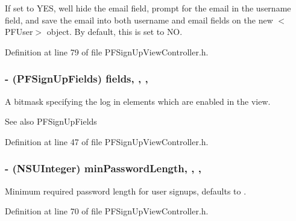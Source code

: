 If set to {\ttfamily Y\+E\+S}, we\textquotesingle{}ll hide the email field, prompt for the email in the username field, and save the email into both username and email fields on the new $<$\+P\+F\+User$>$ object. By default, this is set to {\ttfamily N\+O}. 

Definition at line 79 of file P\+F\+Sign\+Up\+View\+Controller.\+h.

\hypertarget{interface_p_f_sign_up_view_controller_a14aee5e2f66057ce9a998fb8576d412b}{}
\subsubsection[{fields}]{\setlength{\rightskip}{0pt plus 5cm}-\/ (P\+F\+Sign\+Up\+Fields) fields\hspace{0.3cm}{\ttfamily [read]}, {\ttfamily [write]}, {\ttfamily [nonatomic]}, {\ttfamily [assign]}}\label{interface_p_f_sign_up_view_controller_a14aee5e2f66057ce9a998fb8576d412b}
A bitmask specifying the log in elements which are enabled in the view.

\begin{DoxySeeAlso}{See also}
P\+F\+Sign\+Up\+Fields 
\end{DoxySeeAlso}


Definition at line 47 of file P\+F\+Sign\+Up\+View\+Controller.\+h.

\hypertarget{interface_p_f_sign_up_view_controller_a9142fa63faede5be9fe94ab55851c8a7}{}
\subsubsection[{min\+Password\+Length}]{\setlength{\rightskip}{0pt plus 5cm}-\/ (N\+S\+U\+Integer) min\+Password\+Length\hspace{0.3cm}{\ttfamily [read]}, {\ttfamily [write]}, {\ttfamily [nonatomic]}, {\ttfamily [assign]}}\label{interface_p_f_sign_up_view_controller_a9142fa63faede5be9fe94ab55851c8a7}
Minimum required password length for user signups, defaults to {}. 

Definition at line 70 of file P\+F\+Sign\+Up\+View\+Controller.\+h.

